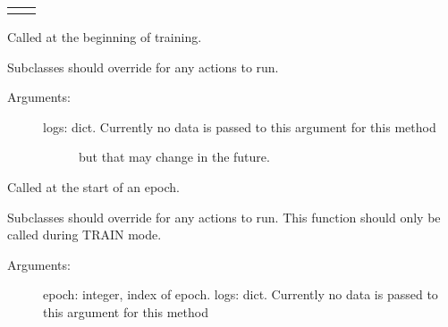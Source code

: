 \documentclass[letterpaper,10pt,english]{sphinxmanual}
\begin{document}
\begin{fulllineitems}
\begin{savenotes}\sphinxattablestart
\centering
\begin{tabulary}{\linewidth}[t]{|T|T|}
\hline

&\\
\hline
{}
&\\
\hline
\end{tabulary}
\par
\sphinxattableend\end{savenotes}

\begin{fulllineitems}
\label{\detokenize{utils/callbacks:utils.callbacks.TimeHistory.on_train_begin}}
Called at the beginning of training.

Subclasses should override for any actions to run.
\begin{description}
\item[{Arguments:}] \leavevmode\begin{description}
\item[{logs: dict. Currently no data is passed to this argument for this method}] \leavevmode
but that may change in the future.

\end{description}

\end{description}

\end{fulllineitems}


\begin{fulllineitems}
\label{\detokenize{utils/callbacks:utils.callbacks.TimeHistory.on_epoch_begin}}
Called at the start of an epoch.

Subclasses should override for any actions to run. This function should only
be called during TRAIN mode.
\begin{description}
\item[{Arguments:}] \leavevmode
epoch: integer, index of epoch.
logs: dict. Currently no data is passed to this argument for this method
\begin{quote}


\end{quote}
\end{description}
\end{fulllineitems}
\end{fulllineitems}
\end{document}

